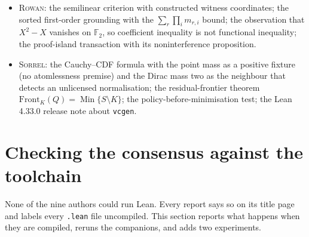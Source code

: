\documentclass[11pt,a4paper]{article}
\newcommand{\code}[1]{\nolinkurl{#1}}
\newcommand{\Ro}{\textsc{Rowan}}
\newcommand{\So}{\textsc{Sorrel}}
\newcommand{\Min}{\operatorname{Min}}
\theoremstyle{definition}
\theoremstyle{plain}
\begin{document}
\begin{itemize}
\item \Ro: the semilinear criterion with constructed witness coordinates; the sorted first-order grounding with the $\sum_r\prod_i m_{r,i}$ bound; the observation that $X^2-X$ vanishes on $\mathbb F_2$, so coefficient inequality is not functional inequality; the proof-island transaction with its noninterference proposition.
\item \So: the Cauchy--CDF formula with the point mass as a positive fixture (no atomlessness premise) and the Dirac mass two as the neighbour that detects an unlicensed normalisation; the residual-frontier theorem $\mathrm{Front}_K(Q)=\Min\{S\setminus K\}$; the policy-before-minimisation test; the Lean 4.33.0 release note about \code{vcgen}.
\end{itemize}

\section{Checking the consensus against the toolchain}\label{sec:toolchain}
None of the nine authors could run Lean. Every report says so on its title page and labels every \code{.lean} file uncompiled. This section reports what happens when they are compiled, reruns the companions, and adds two experiments.
\end{document}

